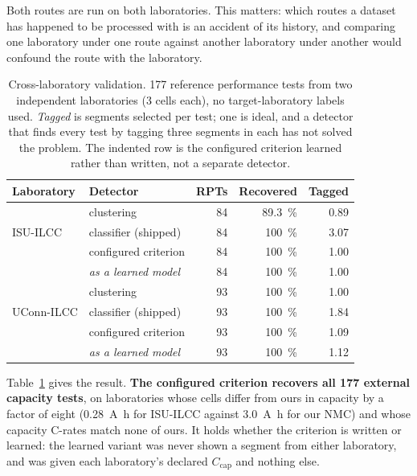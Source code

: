 \documentclass[preprint,3p,number]{elsarticle}
\begin{document}
Both routes are run on both laboratories. This matters: which routes a dataset
has happened to be processed with is an accident of its history, and comparing
one laboratory under one route against another laboratory under another would
confound the route with the laboratory.

\begin{table}[t]
\centering
\caption{Cross-laboratory validation. \num{177} reference performance tests from
two independent laboratories (3 cells each), no target-laboratory labels used.
\emph{Tagged} is segments selected per test; one is ideal, and a detector that
finds every test by tagging three segments in each has not solved the problem.
The indented row is the configured criterion learned rather than written, not a
separate detector.}
\label{tab:external}
\begin{tabular}{llrrr}
\toprule
Laboratory & Detector & RPTs & Recovered & Tagged \\
\midrule
\multirow{3}{*}{ISU-ILCC}
 & clustering                     & \num{84} & \SI{89.3}{\percent} & \num{0.89} \\
 & classifier (shipped)           & \num{84} & \SI{100}{\percent}  & \num{3.07} \\
 & configured criterion           & \num{84} & \SI{100}{\percent}  & \num{1.00} \\
 & \quad\emph{as a learned model} & \num{84} & \SI{100}{\percent}  & \num{1.00} \\
\midrule
\multirow{3}{*}{UConn-ILCC}
 & clustering                     & \num{93} & \SI{100}{\percent}  & \num{1.00} \\
 & classifier (shipped)           & \num{93} & \SI{100}{\percent}  & \num{1.84} \\
 & configured criterion           & \num{93} & \SI{100}{\percent}  & \num{1.09} \\
 & \quad\emph{as a learned model} & \num{93} & \SI{100}{\percent}  & \num{1.12} \\
\bottomrule
\end{tabular}
\end{table}

Table~\ref{tab:external} gives the result. \textbf{The configured criterion
recovers all \num{177} external capacity tests}, on laboratories whose cells
differ from ours in capacity by a factor of eight (\SI{0.28}{\ampere\hour} for
ISU-ILCC against \SI{3.0}{\ampere\hour} for our NMC) and whose capacity C-rates
match none of ours. It holds whether the criterion is written or learned: the
learned variant was never shown a segment from either laboratory, and was given
each laboratory's declared $C_{\mathrm{cap}}$ and nothing else.
\end{document}
